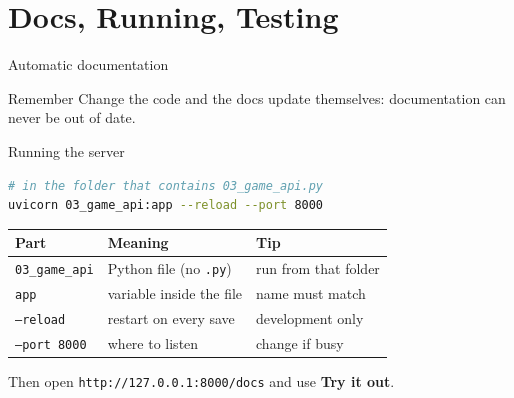 \documentclass[aspectratio=169,10pt]{beamer}
\begin{document}
\section{Docs, Running, Testing}

\begin{frame}{Automatic documentation}
\begin{center}
\end{center}
\begin{block}{Remember}
Change the code and the docs update themselves: documentation can never be out of date.
\end{block}
\end{frame}

\begin{frame}[fragile]{Running the server}
\begin{lstlisting}[language=bash, numbers=none]
# in the folder that contains 03_game_api.py
uvicorn 03_game_api:app --reload --port 8000
\end{lstlisting}
\begin{center}
\begin{tabular}{lll}
\toprule
\textbf{Part} & \textbf{Meaning} & \textbf{Tip} \\
\midrule
\texttt{03\_game\_api} & Python file (no \texttt{.py}) & run from that folder \\
\texttt{app} & variable inside the file & name must match \\
\texttt{--reload} & restart on every save & development only \\
\texttt{--port 8000} & where to listen & change if busy \\
\bottomrule
\end{tabular}
\end{center}
Then open \texttt{http://127.0.0.1:8000/docs} and use \textbf{Try it out}.
\end{frame}
\end{document}
